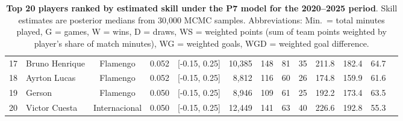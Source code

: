 \begin{table}[htbp]
\begin{tabular}{rlcccrrrrrrrr}
        17 & Bruno Henrique & Flamengo & 0.052 & [-0.15, 0.25] & 10,385 & 148 & 81 & 35 & 211.8 & 182.4 & 64.7 \\
        18 & Ayrton Lucas & Flamengo & 0.052 & [-0.15, 0.25] & 8,812 & 116 & 60 & 26 & 174.8 & 159.9 & 61.6 \\
        19 & Gerson & Flamengo & 0.050 & [-0.15, 0.25] & 8,946 & 109 & 61 & 25 & 192.2 & 173.4 & 63.5 \\
        20 & Victor Cuesta & Internacional & 0.050 & [-0.15, 0.25] & 12,449 & 141 & 63 & 40 & 226.6 & 192.8 & 55.3 \\
        \bottomrule
    \end{tabular}
    \caption{
        \textbf{Top 20 players ranked by estimated skill under the P7 model for the 2020--2025 period}.
        Skill estimates are posterior medians from 30,000 MCMC samples.
        Abbreviations: Min.\ = total minutes played, G = games, W = wins, D = draws, WS = weighted points (sum of team points weighted by player's share of match minutes), WG = weighted goals, WGD = weighted goal difference.
    }
    \label{tab:top20_2020_2025}
\end{table}

